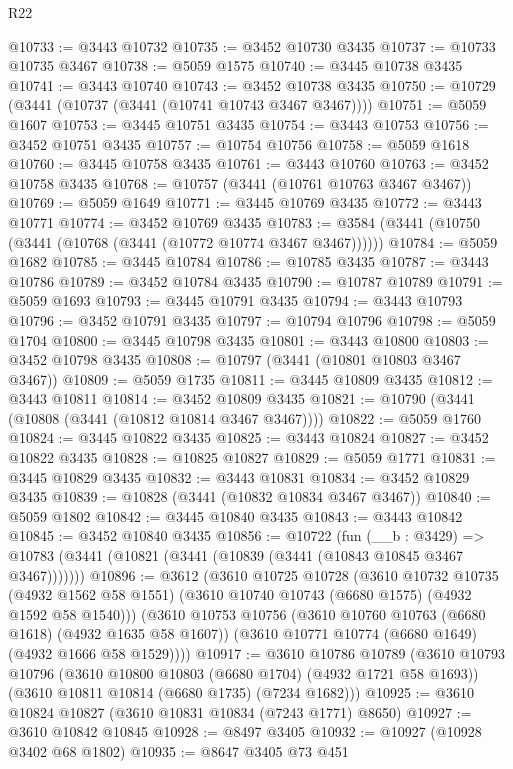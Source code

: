 \begin{lexlean}{R22}
\begin{coremodule}
@10733 := @3443 @10732
@10735 := @3452 @10730 @3435
@10737 := @10733 @10735 @3467
@10738 := @5059 @1575
@10740 := @3445 @10738 @3435
@10741 := @3443 @10740
@10743 := @3452 @10738 @3435
@10750 := @10729 (@3441 (@10737 (@3441 (@10741 @10743 @3467 @3467))))
@10751 := @5059 @1607
@10753 := @3445 @10751 @3435
@10754 := @3443 @10753
@10756 := @3452 @10751 @3435
@10757 := @10754 @10756
@10758 := @5059 @1618
@10760 := @3445 @10758 @3435
@10761 := @3443 @10760
@10763 := @3452 @10758 @3435
@10768 := @10757 (@3441 (@10761 @10763 @3467 @3467))
@10769 := @5059 @1649
@10771 := @3445 @10769 @3435
@10772 := @3443 @10771
@10774 := @3452 @10769 @3435
@10783 := @3584 (@3441 (@10750 (@3441 (@10768 (@3441 (@10772 @10774 @3467 @3467))))))
@10784 := @5059 @1682
@10785 := @3445 @10784
@10786 := @10785 @3435
@10787 := @3443 @10786
@10789 := @3452 @10784 @3435
@10790 := @10787 @10789
@10791 := @5059 @1693
@10793 := @3445 @10791 @3435
@10794 := @3443 @10793
@10796 := @3452 @10791 @3435
@10797 := @10794 @10796
@10798 := @5059 @1704
@10800 := @3445 @10798 @3435
@10801 := @3443 @10800
@10803 := @3452 @10798 @3435
@10808 := @10797 (@3441 (@10801 @10803 @3467 @3467))
@10809 := @5059 @1735
@10811 := @3445 @10809 @3435
@10812 := @3443 @10811
@10814 := @3452 @10809 @3435
@10821 := @10790 (@3441 (@10808 (@3441 (@10812 @10814 @3467 @3467))))
@10822 := @5059 @1760
@10824 := @3445 @10822 @3435
@10825 := @3443 @10824
@10827 := @3452 @10822 @3435
@10828 := @10825 @10827
@10829 := @5059 @1771
@10831 := @3445 @10829 @3435
@10832 := @3443 @10831
@10834 := @3452 @10829 @3435
@10839 := @10828 (@3441 (@10832 @10834 @3467 @3467))
@10840 := @5059 @1802
@10842 := @3445 @10840 @3435
@10843 := @3443 @10842
@10845 := @3452 @10840 @3435
@10856 := @10722
    (fun (__b : @3429) =>
    @10783 (@3441 (@10821 (@3441 (@10839 (@3441 (@10843 @10845 @3467 @3467)))))))
@10896 := @3612
    (@3610
      @10725
      @10728
      (@3610
        @10732
        @10735
        (@4932 @1562 @58 @1551)
        (@3610 @10740 @10743 (@6680 @1575) (@4932 @1592 @58 @1540)))
      (@3610
        @10753
        @10756
        (@3610 @10760 @10763 (@6680 @1618) (@4932 @1635 @58 @1607))
        (@3610 @10771 @10774 (@6680 @1649) (@4932 @1666 @58 @1529))))
@10917 := @3610
    @10786
    @10789
    (@3610
      @10793
      @10796
      (@3610 @10800 @10803 (@6680 @1704) (@4932 @1721 @58 @1693))
      (@3610 @10811 @10814 (@6680 @1735) (@7234 @1682)))
@10925 := @3610 @10824 @10827 (@3610 @10831 @10834 (@7243 @1771) @8650)
@10927 := @3610 @10842 @10845
@10928 := @8497 @3405
@10932 := @10927 (@10928 @3402 @68 @1802)
@10935 := @8647 @3405 @73 @451

\end{coremodule}
\end{lexlean}
